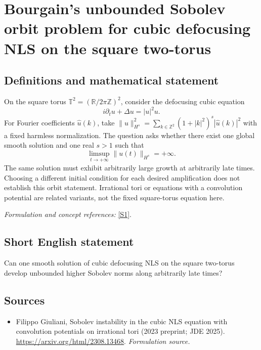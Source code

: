 \documentclass[11pt]{article}
\begin{document}
\section*{\texorpdfstring{Bourgain's unbounded Sobolev orbit problem for cubic defocusing NLS on the square two-torus}{Bourgain's unbounded Sobolev orbit problem for cubic defocusing NLS on the square two-torus}}\label{statement}
\subsection{Definitions and mathematical statement}
On the square torus $\mathbb T^2=({\mathbb{R}}/2\pi{\mathbb{Z}})^2$, consider the defocusing cubic equation
\[
 i\partial_tu+\Delta u=|u|^2u.
\]
For Fourier coefficients $\widehat u(k)$, take $\|u\|_{H^s}^2=\sum_{k\in{\mathbb{Z}}^2}(1+|k|^2)^s|\widehat u(k)|^2$ with a fixed harmless normalization. The question asks whether there exist one global smooth solution and one real $s>1$ such that
\[
 \limsup_{t\to+\infty}\|u(t)\|_{H^s}=+\infty.
\]
The same solution must exhibit arbitrarily large growth at arbitrarily late times. Choosing a different initial condition for each desired amplification does not establish this orbit statement. Irrational tori or equations with a convolution potential are related variants, not the fixed square-torus equation here.
\par\smallskip\textit{Formulation and concept references:} \href{https://arxiv.org/html/2308.13468}{[S1]}.

\subsection{Short English statement}
Can one smooth solution of cubic defocusing NLS on the square two-torus develop unbounded higher Sobolev norms along arbitrarily late times?
\subsection{Sources}
\begin{itemize}
\item[S1]Filippo Giuliani, Sobolev instability in the cubic NLS equation with convolution potentials on irrational tori (2023 preprint; JDE 2025).
\url{https://arxiv.org/html/2308.13468}.
\textit{Formulation source.}
\end{itemize}
\end{document}
